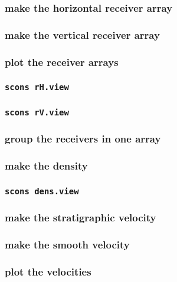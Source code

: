 \begin{frame} \frametitle{make the horizontal receiver array}
\end{frame}
\cwpnote{}

\begin{frame} \frametitle{make the vertical receiver array}
\end{frame}
\cwpnote{}

\begin{frame} \frametitle{plot the receiver arrays}
\end{frame}
\cwpnote{}

\begin{frame} \frametitle{\texttt{scons rH.view}}
\end{frame}
\begin{frame} \frametitle{\texttt{scons rV.view}}
\end{frame}

\begin{frame} \frametitle{group the receivers in one array}
\end{frame}
\cwpnote{}

\begin{frame} \frametitle{make the density}
\end{frame}
\cwpnote{}

\begin{frame} \frametitle{\texttt{scons dens.view}}
\end{frame}

\begin{frame} \frametitle{make the stratigraphic velocity}
\end{frame}
\cwpnote{}

\begin{frame} \frametitle{make the smooth velocity}
\end{frame}
\cwpnote{}

\begin{frame} \frametitle{plot the velocities}
\end{frame}
\cwpnote{}

